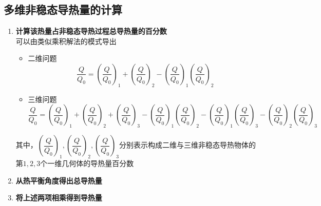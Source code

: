 \subsection{多维非稳态导热量的计算}
\begin{enumerate}[\textbf{步骤} 1 ]
	\item \textbf{计算该热量占非稳态导热过程总导热量的百分数}\\
	可以由类似乘积解法的模式导出
	\begin{itemize}
		\item 二维问题
		\begin{equation}
			\dfrac{Q}{Q_0} = \left(\dfrac{Q}{Q_0}\right)_1 + \left(\dfrac{Q}{Q_0}\right)_2 - \left(\dfrac{Q}{Q_0}\right)_1\left(\dfrac{Q}{Q_0}\right)_2 
		\end{equation}
		
		\item 三维问题
		\begin{equation}
		\dfrac{Q}{Q_0} = \left(\dfrac{Q}{Q_0}\right)_1 + \left(\dfrac{Q}{Q_0}\right)_2 + \left(\dfrac{Q}{Q_0}\right)_3 -\left(\dfrac{Q}{Q_0}\right)_1\left(\dfrac{Q}{Q_0}\right)_2 - \left(\dfrac{Q}{Q_0}\right)_1\left(\dfrac{Q}{Q_0}\right)_3 - \left(\dfrac{Q}{Q_0}\right)_2\left(\dfrac{Q}{Q_0}\right)_3
		\end{equation}
	\end{itemize}
	其中，$\left(\dfrac{Q}{Q_0}\right)_1,\left(\dfrac{Q}{Q_0}\right)_2,\left(\dfrac{Q}{Q_0}\right)_3$分别表示构成二维与三维非稳态导热物体的第$1,2,3$个一维几何体的导热量百分数
	
	\item \textbf{从热平衡角度得出总导热量}
	
	\item \textbf{将上述两项相乘得到导热量}
\end{enumerate}






